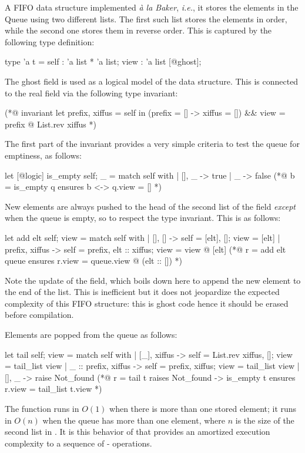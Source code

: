 \documentclass{llncs}
\begin{document}
A FIFO data structure implemented \textit{à la Baker}, \emph{i.e.}, it stores
the elements in the Queue using two different lists. The first such list stores
the elements in order, while the second one stores them in reverse order. This
is captured by the following type definition:
%
\begin{gospel}
  type 'a t = {
    self : 'a list * 'a list;
    view : 'a list [@ghost];
  }
\end{gospel}
%
The  ghost field is used as a logical model of the data structure. This
is connected to the real field  via the following type invariant:
%
\begin{gospel}
    (*@ invariant let prefix, xiffus = self in
                  (prefix = [] -> xiffus = []) &&
                  view = prefix @ List.rev xiffus *)
\end{gospel}
%
The first part of the invariant provides a very simple criteria to test the
queue for emptiness, as follows:
%
\begin{gospel}
  let [@logic] is_empty {self; _} = match self with
    | [], _ -> true
    | _ -> false
  (*@ b = is_empty q
        ensures b <-> q.view = [] *)
\end{gospel}
%
New elements are always pushed to the head of the second list of the 
field \emph{except} when the queue is empty, so to respect the type
invariant. This is as follows:
%
\begin{gospel}
  let add elt {self; view} = match self with
    | [], [] ->
        { self = [elt], []; view = [elt] }
    | prefix, xiffus ->
        { self = prefix, elt :: xiffus; view = view @ [elt] }
  (*@ r = add elt queue
        ensures r.view = queue.view @ (elt :: []) *)
\end{gospel}
%
Note the update of the  field, which boils down here to append the new
element  to the end of the list. This is inefficient but it does not
jeopardize the expected complexity of this FIFO structure: this is ghost code
hence it should be erased before compilation.

Elements are popped from the queue as follows:
%
\begin{gospel}
  let tail {self; view} = match self with
    | [_], xiffus ->
        { self = List.rev xiffus, []; view = tail_list view }
    | _ :: prefix, xiffus ->
        { self = prefix, xiffus; view = tail_list view }
    | [], _ -> raise Not_found
  (*@ r = tail t
        raises  Not_found -> is_empty t
        ensures r.view = tail_list t.view *)
\end{gospel}
%
The  function runs in $O(1)$ when there is more than one stored
element; it runs in $O(n)$ when the queue has more than one element, where $n$
is the size of the second list in . It is this behavior of 
that provides an amortized execution complexity to a sequence of
- operations.
\end{document}
